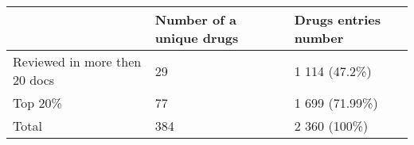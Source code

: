 \begin{tabular}{|p{}|p{}|p{}|}
\hline
                      & Number of a unique drugs & Drugs entries number \\ \hline
Reviewed in more then 20 docs & 29                                & 1 114 (47.2\%)                 \\ \hline
Top 20\%     & 77                                & 1 699 (71.99\%)                \\ \hline
Total        & 384                               & 2 360 (100\%)                  \\ \hline
\end{tabular}
